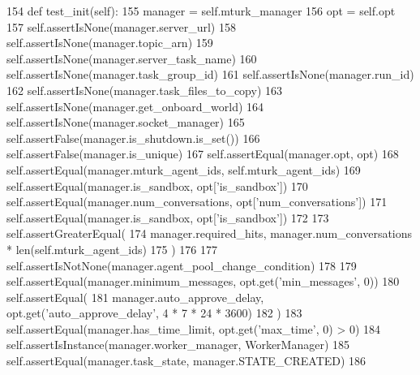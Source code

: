 \begin{DoxyCode}
154     \textcolor{keyword}{def }test\_init(self):
155         manager = self.mturk\_manager
156         opt = self.opt
157         self.assertIsNone(manager.server\_url)
158         self.assertIsNone(manager.topic\_arn)
159         self.assertIsNone(manager.server\_task\_name)
160         self.assertIsNone(manager.task\_group\_id)
161         self.assertIsNone(manager.run\_id)
162         self.assertIsNone(manager.task\_files\_to\_copy)
163         self.assertIsNone(manager.get\_onboard\_world)
164         self.assertIsNone(manager.socket\_manager)
165         self.assertFalse(manager.is\_shutdown.is\_set())
166         self.assertFalse(manager.is\_unique)
167         self.assertEqual(manager.opt, opt)
168         self.assertEqual(manager.mturk\_agent\_ids, self.mturk\_agent\_ids)
169         self.assertEqual(manager.is\_sandbox, opt[\textcolor{stringliteral}{'is\_sandbox'}])
170         self.assertEqual(manager.num\_conversations, opt[\textcolor{stringliteral}{'num\_conversations'}])
171         self.assertEqual(manager.is\_sandbox, opt[\textcolor{stringliteral}{'is\_sandbox'}])
172 
173         self.assertGreaterEqual(
174             manager.required\_hits, manager.num\_conversations * len(self.mturk\_agent\_ids)
175         )
176 
177         self.assertIsNotNone(manager.agent\_pool\_change\_condition)
178 
179         self.assertEqual(manager.minimum\_messages, opt.get(\textcolor{stringliteral}{'min\_messages'}, 0))
180         self.assertEqual(
181             manager.auto\_approve\_delay, opt.get(\textcolor{stringliteral}{'auto\_approve\_delay'}, 4 * 7 * 24 * 3600)
182         )
183         self.assertEqual(manager.has\_time\_limit, opt.get(\textcolor{stringliteral}{'max\_time'}, 0) > 0)
184         self.assertIsInstance(manager.worker\_manager, WorkerManager)
185         self.assertEqual(manager.task\_state, manager.STATE\_CREATED)
186 
\end{DoxyCode}
\mbox{\label{classparlai_1_1mturk_1_1core_1_1dev_1_1test_1_1test__mturk__manager_1_1InitTestMTurkManager_a5ce0c05735e98cf2c0acadcf51bc7651}} 
